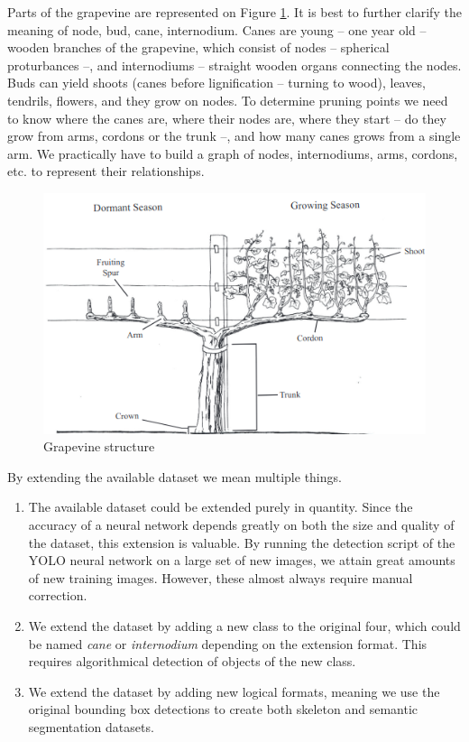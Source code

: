 \documentclass{PSAIE}%
\begin{document}
Parts of the grapevine are represented on Figure \ref{fig_grapevine_structure}. It is best to further clarify
the meaning of node, bud, cane, internodium. Canes are young -- one year old -- wooden branches of the
grapevine, which consist of nodes -- spherical proturbances --, and internodiums -- straight wooden organs
connecting the nodes. Buds can yield shoots (canes before lignification -- turning to wood), leaves, tendrils,
flowers, and they grow on nodes. To determine pruning points we need to know where the canes are, where their
nodes are, where they start -- do they grow from arms, cordons or the trunk --, and how many canes grows from
a single arm. We practically have to build a graph of nodes, internodiums, arms, cordons, etc. to represent
their relationships.

\begin{figure}[h]
      \centering
      \includegraphics[scale=0.7]{images/grapevine_structure.png}
      \caption{Grapevine structure \cite{hellman2003grapevine}}
      \label{fig_grapevine_structure}
\end{figure}

By extending the available dataset we mean multiple things.
\begin{enumerate}
      \item The available dataset could be extended purely in quantity. Since the accuracy of a neural network
            depends greatly on both the size and quality of the dataset, this extension is valuable.
            By running the detection script of the YOLO neural network on a large set of new images,
            we attain great amounts of new training images. However, these almost always require
            manual correction.
      \item We extend the dataset by adding a new class to the original four, which could be named \textit{cane}
            or \textit{internodium} depending on the extension format. This requires algorithmical detection of
            objects of the new class.
      \item We extend the dataset by adding new logical formats, meaning we use the original bounding box
            detections to create both skeleton and semantic segmentation datasets.
\end{enumerate}
\end{document}
